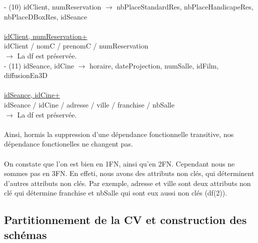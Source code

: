 \documentclass[a4paper,sffamily,12pt]{article}
\begin{document}
				\noindent - (10) idClient, numReservation $\rightarrow$ nbPlaceStandardRes, nbPlaceHandicapeRes, nbPlaceDBoxRes, idSeance \\
					\\
					\underline{idClient, numReservation+} \\
					idClient / nomC / prenomC / numReservation \\									
				$\rightarrow$ La df est préservée. \\		

				\noindent - (11) idSeance, idCine $\rightarrow$ horaire, dateProjection, numSalle, idFilm, diffusionEn3D \\
					\\
					\underline{idSeance, idCine+} \\
					idSeance / idCine / adresse / ville / franchise / nbSalle \\							
				$\rightarrow$ La df est préservée. \\							
				\\		
				
				\indent Ainsi, hormis la suppression d'une dépendance fonctionnelle transitive, nos dépendance fonctionelles ne changent pas. \\																
				\\
				\indent On constate que l'on est bien en 1FN, ainsi qu'en 2FN. Cependant nous ne sommes pas en 3FN. En effeti, nous avons des attributs non clés, qui déterminent d'autres attributs non clés. Par exemple, adresse et ville sont deux attributs non clé qui détermine franchise et nbSalle qui sont eux aussi non clés (df(2)). \\
				
				\vspace{0.5cm}
													
			\subsection{Partitionnement de la CV et construction des schémas} 	
			
				\vspace{0.5cm}
			
\end{document}
